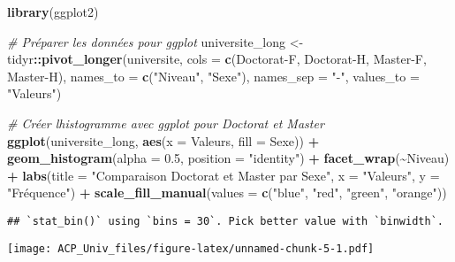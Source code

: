 \documentclass[
]{article}
\newenvironment{Shaded}{\begin{snugshade}}{\end{snugshade}}
\newcommand{\AttributeTok}[1]{\textcolor[rgb]{0.13,0.29,0.53}{#1}}
\newcommand{\CommentTok}[1]{\textcolor[rgb]{0.56,0.35,0.01}{\textit{#1}}}
\newcommand{\FloatTok}[1]{\textcolor[rgb]{0.00,0.00,0.81}{#1}}
\newcommand{\FunctionTok}[1]{\textcolor[rgb]{0.13,0.29,0.53}{\textbf{#1}}}
\newcommand{\NormalTok}[1]{#1}
\newcommand{\OtherTok}[1]{\textcolor[rgb]{0.56,0.35,0.01}{#1}}
\newcommand{\SpecialCharTok}[1]{\textcolor[rgb]{0.81,0.36,0.00}{\textbf{#1}}}
\newcommand{\StringTok}[1]{\textcolor[rgb]{0.31,0.60,0.02}{#1}}
\begin{document}
\begin{Shaded}
\begin{Highlighting}[]
\FunctionTok{library}\NormalTok{(ggplot2)}

\CommentTok{\# Préparer les données pour ggplot}
\NormalTok{universite\_long }\OtherTok{\textless{}{-}}\NormalTok{ tidyr}\SpecialCharTok{::}\FunctionTok{pivot\_longer}\NormalTok{(universite, }\AttributeTok{cols =} \FunctionTok{c}\NormalTok{(}\StringTok{\textasciigrave{}}\AttributeTok{Doctorat{-}F}\StringTok{\textasciigrave{}}\NormalTok{, }\StringTok{\textasciigrave{}}\AttributeTok{Doctorat{-}H}\StringTok{\textasciigrave{}}\NormalTok{, }\StringTok{\textasciigrave{}}\AttributeTok{Master{-}F}\StringTok{\textasciigrave{}}\NormalTok{, }\StringTok{\textasciigrave{}}\AttributeTok{Master{-}H}\StringTok{\textasciigrave{}}\NormalTok{), }
                                       \AttributeTok{names\_to =} \FunctionTok{c}\NormalTok{(}\StringTok{"Niveau"}\NormalTok{, }\StringTok{"Sexe"}\NormalTok{), }\AttributeTok{names\_sep =} \StringTok{"{-}"}\NormalTok{, }\AttributeTok{values\_to =} \StringTok{"Valeurs"}\NormalTok{)}

\CommentTok{\# Créer l\textquotesingle{}histogramme avec ggplot pour Doctorat et Master}
\FunctionTok{ggplot}\NormalTok{(universite\_long, }\FunctionTok{aes}\NormalTok{(}\AttributeTok{x =}\NormalTok{ Valeurs, }\AttributeTok{fill =}\NormalTok{ Sexe)) }\SpecialCharTok{+} 
  \FunctionTok{geom\_histogram}\NormalTok{(}\AttributeTok{alpha =} \FloatTok{0.5}\NormalTok{, }\AttributeTok{position =} \StringTok{"identity"}\NormalTok{) }\SpecialCharTok{+}
  \FunctionTok{facet\_wrap}\NormalTok{(}\SpecialCharTok{\textasciitilde{}}\NormalTok{Niveau) }\SpecialCharTok{+}
  \FunctionTok{labs}\NormalTok{(}\AttributeTok{title =} \StringTok{"Comparaison Doctorat et Master par Sexe"}\NormalTok{, }\AttributeTok{x =} \StringTok{"Valeurs"}\NormalTok{, }\AttributeTok{y =} \StringTok{"Fréquence"}\NormalTok{) }\SpecialCharTok{+}
  \FunctionTok{scale\_fill\_manual}\NormalTok{(}\AttributeTok{values =} \FunctionTok{c}\NormalTok{(}\StringTok{"blue"}\NormalTok{, }\StringTok{"red"}\NormalTok{, }\StringTok{"green"}\NormalTok{, }\StringTok{"orange"}\NormalTok{))}
\end{Highlighting}
\end{Shaded}

\begin{verbatim}
## `stat_bin()` using `bins = 30`. Pick better value with `binwidth`.
\end{verbatim}

\texttt{[image: ACP\_Univ\_files/figure-latex/unnamed-chunk-5-1.pdf]}
\end{document}
